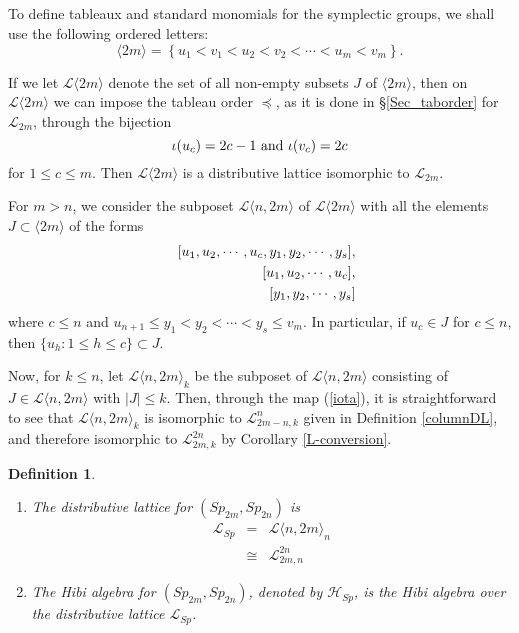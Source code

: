 \documentclass[11pt]{amsart}
\numberwithin{equation}{subsection}
\newtheorem{definition}[theorem]{Definition}
\begin{document}
\subsection{}\label{Sp-distlattice}

To define tableaux and standard monomials for the symplectic groups,
we shall use the following ordered letters:
\begin{equation}\label{Sp-alphabet}
\langle 2m \rangle = \left\{ u_1 < v_1 < u_2 < v_2 < \cdots < u_m < v_m \right\}.
\end{equation}

If we let $\mathcal{L}\langle 2m \rangle$ denote the set of all non-empty subsets $J$ of 
$\langle 2m \rangle$, then on $\mathcal{L}\langle 2m \rangle$ we can impose the tableau 
order $\preceq$, as it is done in \S \ref{Sec_taborder} for $\mathcal{L}_{2m}$, through 
the bijection 
\begin{equation}\label{iota}
\iota(u_c)= 2c-1 \hbox{ and } \iota(v_c)=2c
\end{equation}
for $1 \leq c \leq m$. Then $\mathcal{L}\langle 2m \rangle$ is a distributive lattice 
isomorphic to $\mathcal{L}_{2m}$. 

\medskip

For $m > n$, we consider the subposet 
$\mathcal{L}\langle n, 2m \rangle$ of $\mathcal{L}\langle 2m \rangle$ with all 
the elements $J \subset \langle 2m \rangle$ of the forms 
\begin{eqnarray}\label{L_Sp_elements}
&&[u_1,u_2,\cdots ,u_c,y_{1},y_{2}, \cdots , y_{s}], \\
&&[u_1,u_2,\cdots ,u_c],  \notag \\
&&[y_{1},y_{2},\cdots ,y_{s}] \notag
\end{eqnarray}
where $c \leq n$ and $u_{n+1} \leq y_1 < y_2 < \cdots < y_s \leq v_m$. In particular,
if $u_c \in J$ for $c \leq n$, then $\{ u_h: 1 \leq h \leq c \} \subset J$.

\smallskip

Now, for $k \leq n$, let $\mathcal{L}\langle n, 2m \rangle_k$ be the subposet of
$\mathcal{L}\langle n, 2m \rangle$ consisting of $J \in \mathcal{L}\langle n, 2m \rangle$
with $|J| \leq k$. Then, through the map (\ref{iota}), it is straightforward to see that 
$\mathcal{L}\langle n, 2m \rangle_k$ is isomorphic to
$\mathcal{L}_{2m-n,k}^{n}$ given in Definition \ref{columnDL}, and therefore 
isomorphic to $\mathcal{L}_{2m, k}^{2n}$ by Corollary \ref{L-conversion}.

\begin{definition}
\begin{enumerate}
\item The distributive lattice for $(Sp_{2m}, Sp_{2n})$ is 
\begin{eqnarray*}
\mathcal{L}_{Sp} &=& \mathcal{L}\langle n, 2m \rangle_n \\
&\cong& \mathcal{L}_{2m, n}^{2n}
\end{eqnarray*}
\item The Hibi algebra for $(Sp_{2m}, Sp_{2n})$, denoted by $\mathcal{H}_{Sp}$, 
is the Hibi algebra over the distributive lattice $\mathcal{L}_{Sp}$.
\end{enumerate}
\end{definition}
\end{document}
